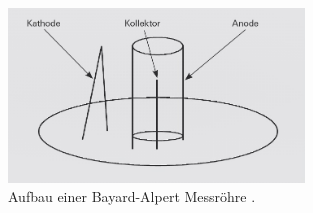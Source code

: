 \begin{figure}[H]
    \centering
    \includegraphics[width=0.7\textwidth]{data/bayard-alpert-messroehre.jpg}
    \caption{Aufbau einer Bayard-Alpert Messröhre \cite{Totaldruckmessung}.}
    \label{fig:bayardalpertmessroehre}
\end{figure}